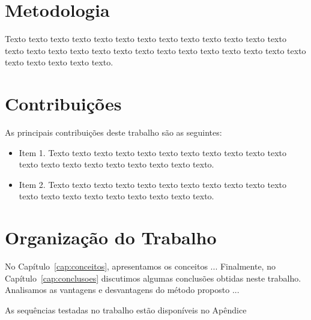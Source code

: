 \section{Metodologia}
\label{sec:metodologia}

Texto texto texto texto texto texto texto texto texto texto texto texto texto
texto texto texto texto texto texto texto texto texto texto texto texto texto
texto texto texto texto texto texto.

\section{Contribuições}
\label{sec:contribucoes}

As principais contribuições deste trabalho são as seguintes:

\begin{itemize}
  \item Item 1. Texto texto texto texto texto texto texto texto texto texto
  texto texto texto texto texto texto texto texto texto texto.

  \item Item 2. Texto texto texto texto texto texto texto texto texto texto
  texto texto texto texto texto texto texto texto texto texto.

\end{itemize}

\section{Organização do Trabalho}
\label{sec:organizacao_trabalho}

No Capítulo~\ref{cap:conceitos}, apresentamos os conceitos ... Finalmente, no
Capítulo~\ref{cap:conclusoes} discutimos algumas conclusões obtidas neste
trabalho. Analisamos as vantagens e desvantagens do método proposto ...

As sequências testadas no trabalho estão disponíveis no Apêndice
